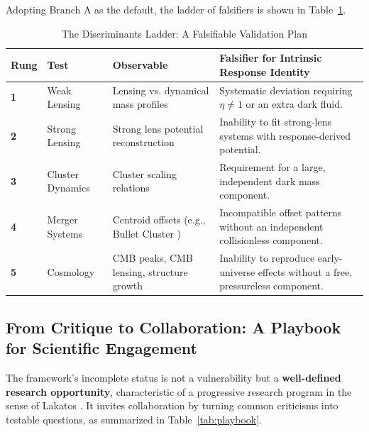 \documentclass[12pt,onecolumn]{aastex631}
\begin{document}
Adopting Branch A as the default, the ladder of falsifiers is shown in Table~\ref{tab:ladder}.

\begin{table}[ht!]
\centering
\caption{The Discriminants Ladder: A Falsifiable Validation Plan}
\label{tab:ladder}
\begin{tabular}{llll}
\toprule
\textbf{Rung} & \textbf{Test} & \textbf{Observable} & \textbf{Falsifier for Intrinsic Response Identity} \\
\midrule
\textbf{1} & Weak Lensing & Lensing vs. dynamical mass profiles & Systematic deviation requiring \(\eta\neq 1\) or an extra dark fluid. \\
\textbf{2} & Strong Lensing & Strong lens potential reconstruction & Inability to fit strong-lens systems with response-derived potential. \\
\textbf{3} & Cluster Dynamics & Cluster scaling relations & Requirement for a large, independent dark mass component. \\
\textbf{4} & Merger Systems & Centroid offsets (e.g., Bullet Cluster \citep{Clowe2006}) & Incompatible offset patterns without an independent collisionless component. \\
\textbf{5} & Cosmology & CMB peaks, CMB lensing, structure growth & Inability to reproduce early-universe effects without a free, pressureless component. \\
\bottomrule
\end{tabular}
\end{table}

\subsection{From Critique to Collaboration: A Playbook for Scientific Engagement}
The framework’s incomplete status is not a vulnerability but a \textbf{well-defined research opportunity}, characteristic of a progressive research program in the sense of Lakatos \citep{Lakatos1978}. It invites collaboration by turning common criticisms into testable questions, as summarized in Table~\ref{tab:playbook}.
\end{document}
